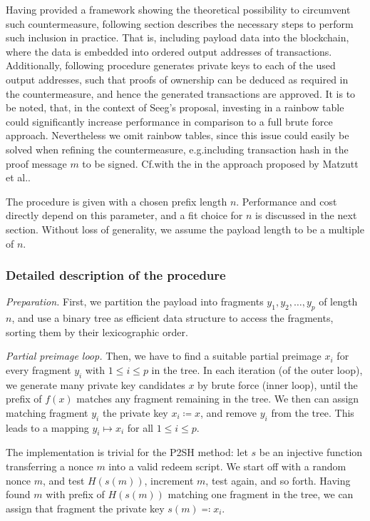 \documentclass[a4paper,11pt,titlepage]{scrbook}
\begin{document}
Having provided a framework showing the theoretical possibility to circumvent such countermeasure, following section describes the necessary steps to perform such inclusion in practice.
That is, including payload data into the blockchain, where the data is embedded into ordered output addresses of transactions.
Additionally, following procedure generates private keys to each of the used output addresses, such that proofs of ownership can be deduced as required in the countermeasure, and hence the generated transactions are approved.
It is to be noted, that, in the context of Seeg's proposal, investing in a rainbow table could significantly increase performance in comparison to a full brute force approach.
Nevertheless we omit rainbow tables, since this issue could easily be solved when refining the countermeasure, e.g.\@ including transaction hash in the proof message $m$ to be signed.
Cf.\@ with the  in the approach proposed by Matzutt et al.\@ \cite[368--369]{matzutt_thwarting_2018}.

The procedure is given with a chosen prefix length $n$. Performance and cost directly depend on this parameter, and a fit choice for $n$ is discussed in the next section.
Without loss of generality, we assume the payload length to be a multiple of $n$.

\subsubsection*{Detailed description of the procedure}

\emph{Preparation.} First, we partition the payload into fragments $y_1, y_2, \dots, y_p$ of length $n$, and use a binary tree as efficient data structure to access the fragments, sorting them by their lexicographic order.

\emph{Partial preimage loop.} 
Then, we have to find a suitable partial preimage $x_i$ for every fragment $y_i$ with $1\leq i \leq p$ in the tree.
In each iteration (of the outer loop), we generate many private key candidates $x$ by brute force (inner loop), until the prefix of $f(x)$ matches any fragment remaining in the tree.
We then can assign matching fragment $y_i$ the private key $x_i \coloneqq x$, and remove $y_i$ from the tree.
This leads to a mapping $y_i \mapsto x_i$ for all $1\leq i\leq p$.

The implementation is trivial for the P2SH method: let $s$ be an injective function transferring a nonce $m$ into a valid redeem script.
We start off with a random nonce $m$, and test $H(s(m))$, increment $m$, test again, and so forth.
Having found $m$ with prefix of $H(s(m))$ matching one fragment in the tree, we can assign that fragment the private key $s(m)\eqqcolon x_i$.
\end{document}

